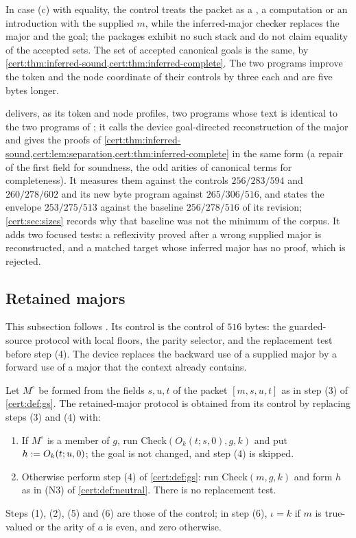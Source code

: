 In case (c) with equality, the control treats the packet as a ,
a computation or an introduction with the supplied $m$, while the
inferred-major checker replaces the major and the goal; the packages exhibit
no such stack and do not claim equality of the accepted sets. The set of
accepted canonical goals is the same, by
\cref{cert:thm:inferred-sound,cert:thm:inferred-complete}. The two programs
improve the token and the node coordinate of their controls by three each and
are five bytes longer.

\begin{remark}\label{cert:rem:inferred-retained}
 delivers, as its token and node profiles, two programs
whose text is identical to the two programs of ; it calls
the device goal-directed reconstruction of the major and gives the proofs of
\cref{cert:thm:inferred-sound,cert:lem:separation,cert:thm:inferred-complete}
in the same form (a repair of the first field for soundness, the odd arities
of canonical terms for completeness). It measures them against the controls
$256/283/594$ and $260/278/602$ and its new byte program against
$265/306/516$, and states the envelope $253/275/513$ against the baseline
$256/278/516$ of its revision; \cref{cert:sec:sizes} records why that baseline
was not the minimum of the corpus. It adds two focused tests: a reflexivity
proved after a wrong supplied major is reconstructed, and a matched target
whose inferred major has no proof, which is rejected.
\end{remark}

\subsection{Retained majors}\label{cert:sec:retained}

This subsection follows . Its control is the control
of $516$ bytes: the guarded-source protocol with local floors, the parity
selector, and the replacement test before step (4). The device replaces the
backward use of a supplied major by a forward use of a major that the context
already contains.

\begin{definition}\label{cert:def:retained}
Let $M^{\circ}$ be formed from the fields $s,u,t$ of the packet $[m,s,u,t]$ as
in step (3) of \cref{cert:def:gs}. The retained-major protocol is obtained
from its control by replacing steps (3) and (4) with:
\begin{enumerate}
\item[(3r)] If $M^{\circ}$ is a member of $g$, run
$\mathrm{Check}(O_k(t;s,0),g,k)$ and put $h\mathrel{:=} O_k(t;u,0)$; the goal is not
changed, and step (4) is skipped.
\item[(4r)] Otherwise perform step (4) of \cref{cert:def:gs}: run
$\mathrm{Check}(m,g,k)$ and form $h$ as in (N3) of \cref{cert:def:neutral}.
There is no replacement test.
\end{enumerate}
Steps (1), (2), (5) and (6) are those of the control; in step (6), $\iota=k$
if $m$ is true-valued or the arity of $a$ is even, and zero otherwise.
\end{definition}

